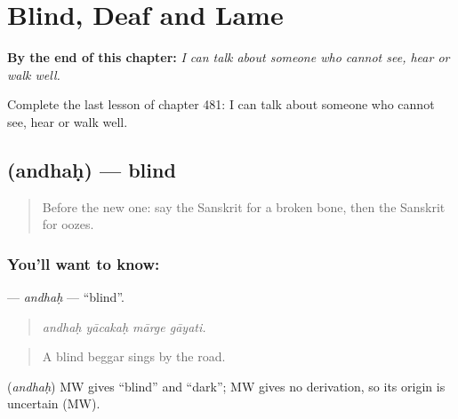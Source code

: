 
\chapter{Blind, Deaf and Lame}
\label{ch:sa-blind-deaf-and-lame}

\begin{chapteropening}
\textbf{By the end of this chapter:} \emph{I can talk about someone who cannot see, hear or walk well.}

Complete the last lesson of chapter 481: I can talk about someone who cannot see, hear or walk well.
\end{chapteropening}

\section[\texorpdfstring{\sk{अन्धः} (andhaḥ)}{अन्धः (andhaḥ)}]{ (andhaḥ) — blind}

\label{lesson:SA-C481-andhah}



\begin{quote}
Before the new one: say the Sanskrit for a broken bone, then the Sanskrit for oozes.
\end{quote}

\subsection*{You'll want to know: }
\textbf{} — \emph{andhaḥ} — \textquotedblleft{}blind\textquotedblright{}.

\begin{quote}
   
\end{quote}

\begin{quote}
\emph{andhaḥ yācakaḥ mārge gāyati.}
\end{quote}

\begin{quote}
A blind beggar sings by the road.
\end{quote}

\begin{cousinweb}
\textbf{} (\emph{andhaḥ}) MW gives \textquotedblleft{}blind\textquotedblright{} and \textquotedblleft{}dark\textquotedblright{}; MW gives no derivation, so its origin is uncertain (MW).
\end{cousinweb}

